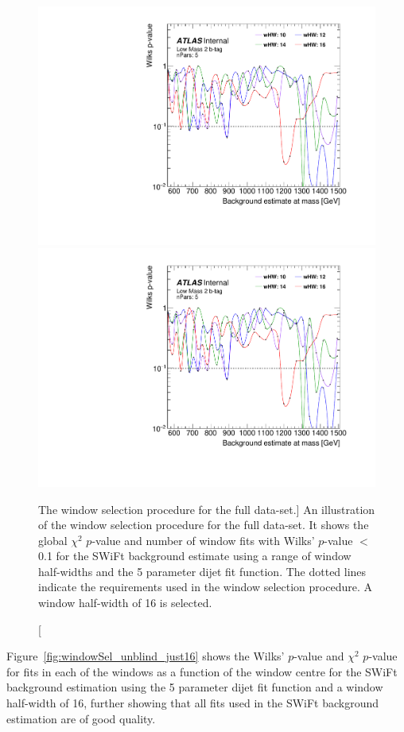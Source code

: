 \begin{figure}[!htb]
\captionsetup[subfigure]{aboveskip=0pt,justification=centering}
\centering
{} {
  \includegraphics[width=0.45\linewidth, angle=0,page=6]{figs/Dibjet/LowMass/FitStudy_min566/windowSel_unblind.pdf}
}\hspace{-5mm}
 {
  \includegraphics[width=0.45\linewidth, angle=0,page=8]{figs/Dibjet/LowMass/FitStudy_min566/windowSel_unblind.pdf}
}
\vspace{2pt}
\caption
    [The window selection procedure for the full \lm{} data-set.]
    {\label{fig:windowSel_unblind}
      An illustration of the window selection procedure for the full \lm{} data-set.
      It shows the global $\chi^{2}$ \mbox{$p$-value} and number of window fits with Wilks' \mbox{$p$-value} $<$ 0.1
      for the SWiFt background estimate using a range of window half-widths and the 5 parameter dijet fit function.
      The dotted lines indicate the requirements used in the window selection procedure. A window half-width of 16 is selected.
    }
\end{figure}

\newpage
Figure~\ref{fig:windowSel_unblind_just16} shows the Wilks' $p$-value and $\chi^2$ $p$-value for fits in each of the windows
as a function of the window centre for the SWiFt background estimation using the 5 parameter dijet fit function and a window half-width of 16,
further showing that all fits used in the SWiFt background estimation are of good quality.

